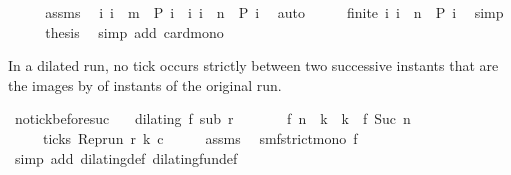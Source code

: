 \begin{isabellebody}
%
\isadelimproof
%
\endisadelimproof
%
\isatagproof
{}\isamarkupfalse%
\ {\isacharminus}\isanewline
\ \ \isamarkupfalse%
\ assms\ \isamarkupfalse%
\ {\isacartoucheopen}{\isacharbraceleft}i{\isachardot}\ i\ {\isasymle}\ m\ {\isasymand}\ P\ i{\isacharbraceright}\ {\isasymsubseteq}\ {\isacharbraceleft}i{\isachardot}\ i\ {\isasymle}\ n\ {\isasymand}\ P\ i{\isacharbraceright}{\isacartoucheclose}\ \isamarkupfalse%
\ auto\isanewline
\ \ \isamarkupfalse%
\ \isamarkupfalse%
\ {\isacartoucheopen}finite\ {\isacharbraceleft}i{\isachardot}\ i\ {\isasymle}\ n\ {\isasymand}\ P\ i{\isacharbraceright}{\isacartoucheclose}\ \isamarkupfalse%
\ simp\isanewline
\ \ \isamarkupfalse%
\ \isamarkupfalse%
\ {\isacharquery}thesis\ \isamarkupfalse%
\ {\isacharparenleft}simp\ add{\isacharcolon}\ card{\isacharunderscore}mono{\isacharparenright}\isanewline
{}\isamarkupfalse%
%
\endisatagproof
{\isafoldproof}%
%
\isadelimproof
%
\endisadelimproof
%
\begin{isamarkuptext}%
In a dilated run, no tick occurs strictly between two successive instants that 
  are the images by  of instants of the original run.%
\end{isamarkuptext}\isamarkuptrue%
\isamarkupfalse%
\ no{\isacharunderscore}tick{\isacharunderscore}before{\isacharunderscore}suc{\isacharcolon}\isanewline
\ \ \ {\isacartoucheopen}dilating\ f\ sub\ r{\isacartoucheclose}\isanewline
\ \ \ \ \ \ \ {\isacartoucheopen}{\isacharparenleft}f\ n{\isacharparenright}\ {\isacharless}\ k\ {\isasymand}\ k\ {\isacharless}\ {\isacharparenleft}f\ {\isacharparenleft}Suc\ n{\isacharparenright}{\isacharparenright}{\isacartoucheclose}\isanewline
\ \ \ \ \ {\isacartoucheopen}{\isasymnot}ticks\ {\isacharparenleft}{\isacharparenleft}Rep{\isacharunderscore}run\ r{\isacharparenright}\ k\ c{\isacharparenright}{\isacartoucheclose}\isanewline
%
\isadelimproof
%
\endisadelimproof
%
\isatagproof
{}\isamarkupfalse%
\ {\isacharminus}\isanewline
\ \ \isamarkupfalse%
\ assms{\isacharparenleft}{}{\isacharparenright}\ \isamarkupfalse%
\ smf{\isacharcolon}{\isacartoucheopen}strict{\isacharunderscore}mono\ f{\isacartoucheclose}\ \isamarkupfalse%
\ {\isacharparenleft}simp\ add{\isacharcolon}\ dilating{\isacharunderscore}def\ dilating{\isacharunderscore}fun{\isacharunderscore}def{\isacharparenright}\isanewline

\end{isabellebody}
